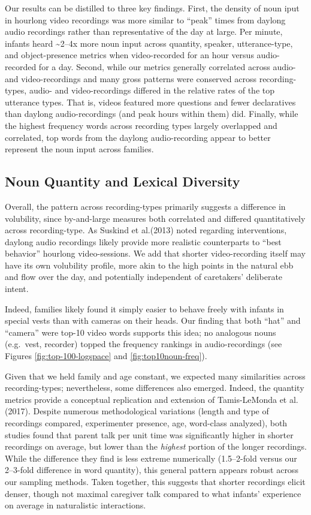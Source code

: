 \documentclass[man]{apa6}
\theoremstyle{definition}
\theoremstyle{definition}
\theoremstyle{definition}
\theoremstyle{remark}
\begin{document}
Our results can be distilled to three key findings. First, the density
of noun iput in hourlong video recordings was more similar to
\enquote{peak} times from daylong audio recordings rather than
representative of the day at large. Per minute, infants heard
\textasciitilde{}2--4x more noun input across quantity, speaker,
utterance-type, and object-presence metrics when video-recorded for an
hour versus audio-recorded for a day. Second, while our metrics
generally correlated across audio- and video-recordings and many gross
patterns were conserved across recording-types, audio- and
video-recordings differed in the relative rates of the top utterance
types. That is, videos featured more questions and fewer declaratives
than daylong audio-recordings (and peak hours within them) did. Finally,
while the highest frequency words across recording types largely
overlapped and correlated, top words from the daylong audio-recording
appear to better represent the noun input across families.

\subsection{Noun Quantity and Lexical
Diversity}\label{noun-quantity-and-lexical-diversity}

Overall, the pattern across recording-types primarily suggests a
difference in volubility, since by-and-large measures both correlated
and differed quantitatively across recording-type. As Suskind et
al.(2013) noted regarding interventions, daylong audio recordings likely
provide more realistic counterparts to \enquote{best behavior} hourlong
video-sessions. We add that shorter video-recording itself may have its
own volubility profile, more akin to the high points in the natural ebb
and flow over the day, and potentially independent of caretakers'
deliberate intent.

Indeed, families likely found it simply easier to behave freely with
infants in special vests than with cameras on their heads. Our finding
that both \enquote{hat} and \enquote{camera} were top-10 video words
supports this idea; no analogous nouns (e.g.~vest, recorder) topped the
frequency rankings in audio-recordings (see Figures
\ref{fig:top-100-logspace} and \ref{fig:top10noun-freq}).

Given that we held family and age constant, we expected many
similarities across recording-types; nevertheless, some differences also
emerged. Indeed, the quantity metrics provide a conceptual replication
and extension of Tamis-LeMonda et al. (2017). Despite numerous
methodological variations (length and type of recordings compared,
experimenter presence, age, word-class analyzed), both studies found
that parent talk per unit time was significantly higher in shorter
recordings on average, but lower than the \emph{highest} portion of the
longer recordings. While the difference they find is less extreme
numerically (1.5--2-fold versus our 2--3-fold difference in word
quantity), this general pattern appears robust across our sampling
methods. Taken together, this suggests that shorter recordings elicit
denser, though not maximal caregiver talk compared to what infants'
experience on average in naturalistic interactions.
\end{document}
